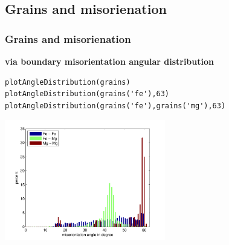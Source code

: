 \subsection{Grains and misorienation}
\begin{frame}[fragile]
  \frametitle{Grains and misorienation}

\begin{overprint}
\textbf{via boundary misorientation angular distribution} %
\begin{lstlisting}
plotAngleDistribution(grains)
plotAngleDistribution(grains('fe'),63)
plotAngleDistribution(grains('fe'),grains('mg'),63)
\end{lstlisting}
\begin{center}
\includegraphics[width=7cm]{fig/grains_angledistribution}
\par\end{center}

\end{overprint}
\end{frame}







